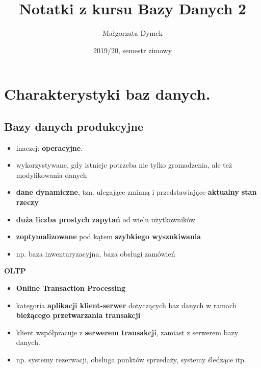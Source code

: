 \documentclass[a4paper]{article}
\title{Notatki z kursu Bazy Danych 2}
\author{Małgorzata Dymek}
\date{2019/20, semestr zimowy}
\begin{document}
    \maketitle


    \section{Charakterystyki baz danych.}

    \subsection{Bazy danych produkcyjne}
    \begin{itemize}[noitemsep]
        \item inaczej: \textbf{operacyjne}.
        \item wykorzystywane, gdy istnieje potrzeba nie tylko gromadzenia, ale też modyfikowania danych
        \item \textbf{dane dynamiczne}, tzn. ulegające zmianą i przedstawiające \textbf{aktualny stan rzeczy}
        \item \textbf{duża liczba prostych zapytań} od wielu użytkowników
        \item \textbf{zoptymalizowane} pod kątem \textbf{szybkiego wyszukiwania}
        \item np. baza inwentaryzacyjna, baza obsługi zamówień
    \end{itemize}


    \textbf{OLTP}
    \begin{itemize}[noitemsep]
        \item \textbf{Online Transaction Processing}
        \item kategoria \textbf{aplikacji klient-serwer} dotyczących baz danych w ramach \textbf{bieżącego
        przetwarzania transakcji}
        \item klient współpracuje z \textbf{serwerem transakcji}, zamiast z serwerem bazy danych.
        \item np. systemy rezerwacji, obsługa punktów sprzedaży, systemy śledzące itp.
    \end{itemize}
\end{document}
